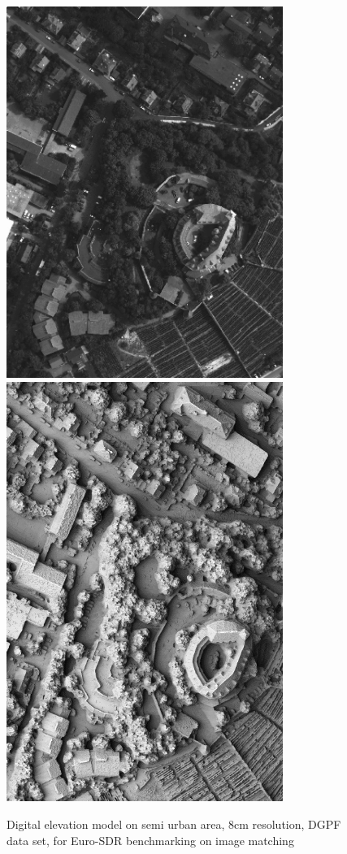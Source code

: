 \begin{figure}
\includegraphics[width=90mm]{FIGS/SAMPLES/DGPF_8Bits.jpg}
\includegraphics[width=90mm]{FIGS/SAMPLES/DGF-SHADE.jpg}
\caption{Digital elevation model on semi urban area, 8cm resolution, DGPF data set, for
Euro-SDR benchmarking on image matching}
\end{figure}

